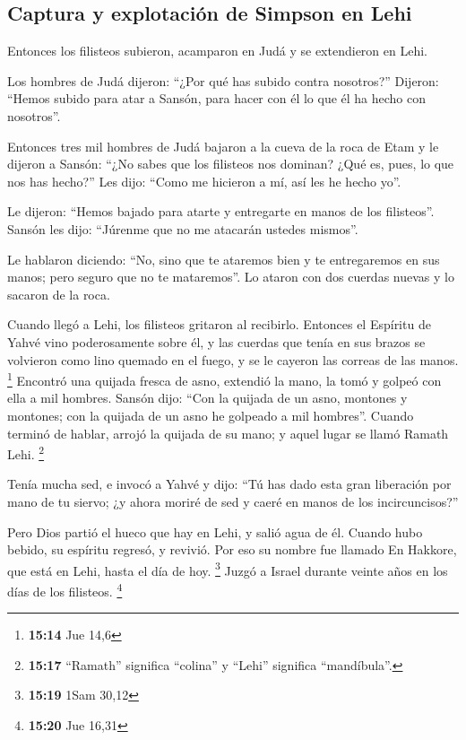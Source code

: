 \hypertarget{captura-y-explotaciuxf3n-de-simpson-en-lehi}{%
\subsection{Captura y explotación de Simpson en
Lehi}\label{captura-y-explotaciuxf3n-de-simpson-en-lehi}}

 Entonces los filisteos subieron, acamparon en Judá y se
extendieron en Lehi.

 Los hombres de Judá dijeron: ``¿Por qué has subido
contra nosotros?'' Dijeron: ``Hemos subido para atar a Sansón, para
hacer con él lo que él ha hecho con nosotros''.

 Entonces tres mil hombres de Judá bajaron a la cueva de
la roca de Etam y le dijeron a Sansón: ``¿No sabes que los filisteos nos
dominan? ¿Qué es, pues, lo que nos has hecho?'' Les dijo: ``Como me
hicieron a mí, así les he hecho yo''.

 Le dijeron: ``Hemos bajado para atarte y entregarte en
manos de los filisteos''. Sansón les dijo: ``Júrenme que no me atacarán
ustedes mismos''.

 Le hablaron diciendo: ``No, sino que te ataremos bien y
te entregaremos en sus manos; pero seguro que no te mataremos''. Lo
ataron con dos cuerdas nuevas y lo sacaron de la roca.

 Cuando llegó a Lehi, los filisteos gritaron al
recibirlo. Entonces el Espíritu de Yahvé vino poderosamente sobre él, y
las cuerdas que tenía en sus brazos se volvieron como lino quemado en el
fuego, y se le cayeron las correas de las manos. \footnote{\textbf{15:14}
  Jue 14,6}  Encontró una quijada fresca de asno,
extendió la mano, la tomó y golpeó con ella a mil hombres.
 Sansón dijo: ``Con la quijada de un asno, montones y
montones; con la quijada de un asno he golpeado a mil hombres''.
 Cuando terminó de hablar, arrojó la quijada de su mano;
y aquel lugar se llamó Ramath Lehi. \footnote{\textbf{15:17} ``Ramath''
  significa ``colina'' y ``Lehi'' significa ``mandíbula''.}

 Tenía mucha sed, e invocó a Yahvé y dijo: ``Tú has dado
esta gran liberación por mano de tu siervo; ¿y ahora moriré de sed y
caeré en manos de los incircuncisos?''

 Pero Dios partió el hueco que hay en Lehi, y salió agua
de él. Cuando hubo bebido, su espíritu regresó, y revivió. Por eso su
nombre fue llamado En Hakkore, que está en Lehi, hasta el día de hoy.
\footnote{\textbf{15:19} 1Sam 30,12}  Juzgó a Israel
durante veinte años en los días de los filisteos. \footnote{\textbf{15:20}
  Jue 16,31}

